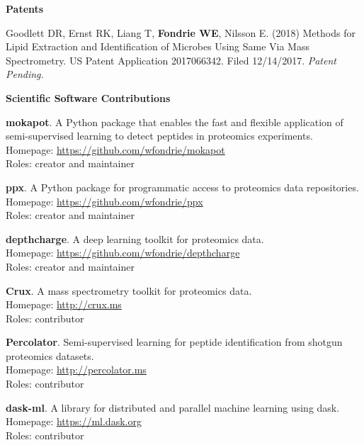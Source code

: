 \documentclass[11pt]{article}
\newcommand{\mysection}[1]{\vspace{1ex} \textbf{\large \textsf{#1} \quad \hrulefill}}
\newcommand{\myref}[1]{\href{#1}{\url{#1}}}
\begin{document}
\mysection{Patents}
\begin{etaremune}
  \item Goodlett DR, Ernst RK, Liang T, \textbf{Fondrie WE}, Nilsson E. (2018)
  Methods for Lipid Extraction and Identification of Microbes Using Same Via
  Mass Spectrometry. US Patent Application 2017066342. Filed 12/14/2017. {\it
    Patent Pending.}
\end{etaremune}


\mysection{Scientific Software Contributions}
\begin{etaremune}
  \item \textbf{mokapot}. A Python package that enables the fast and flexible
  application of semi-supervised learning to detect peptides in proteomics
  experiments. \\
  Homepage: \myref{https://github.com/wfondrie/mokapot} \\
  Roles: creator and maintainer

  \item \textbf{ppx}. A Python package for programmatic access to proteomics
  data repositories. \\
  Homepage: \myref{https://github.com/wfondrie/ppx} \\
  Roles: creator and maintainer

  \item \textbf{depthcharge}. A deep learning toolkit for proteomics data. \\
  Homepage: \myref{https://github.com/wfondrie/depthcharge} \\
  Roles: creator and maintainer

  \item \textbf{Crux}. A mass spectrometry toolkit for proteomics data. \\
  Homepage: \myref{http://crux.ms} \\
  Roles: contributor

  \item \textbf{Percolator}. Semi-supervised learning for peptide
  identification from shotgun proteomics datasets. \\
  Homepage: \myref{http://percolator.ms} \\
  Roles: contributor

  \item \textbf{dask-ml}. A library for distributed and parallel machine
  learning using dask. \\
  Homepage: \myref{https://ml.dask.org} \\
  Roles: contributor


\end{etaremune}
\end{document}
